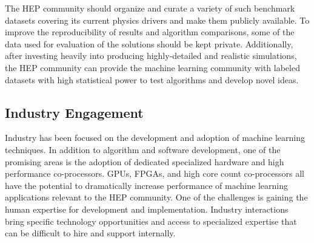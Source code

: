 

The HEP community should organize and curate a variety of such benchmark datasets covering its current physics drivers and make them publicly available. To improve the reproducibility of results and algorithm comparisons, some of the data used for evaluation of the solutions should be kept private.
Additionally, after investing heavily into producing highly-detailed and realistic simulations, the HEP community can provide the machine learning community with labeled datasets with high statistical power to test algorithms and develop novel ideas.



\subsection{Industry Engagement}
Industry has been focused on the development and adoption of machine learning techniques. In addition to algorithm and software development, one of the promising areas is the adoption of dedicated specialized hardware and high performance co-processors. GPUs, FPGAs, and high core count co-processors all have the potential to dramatically increase performance of machine learning applications relevant to the HEP community.
One of the challenges is gaining the human expertise for development and implementation. Industry interactions bring specific technology opportunities and access to specialized expertise that can be difficult to hire and support internally.

